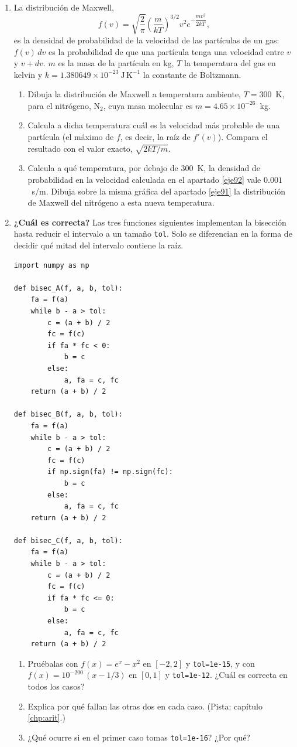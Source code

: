 \begin{enumerate}
\item La distribución de Maxwell,
\begin{equation*}
f(v) = \sqrt{\frac{2}{\pi}}\left( \frac{m}{kT}\right)^{3/2}v^2e^{-\dfrac{\scriptstyle mv^2}{\scriptstyle 2kT}},
\end{equation*}
es la densidad de probabilidad de la velocidad de las partículas de un gas: $f(v)\,dv$ es la probabilidad de que una partícula tenga una velocidad entre $v$ y $v+dv$. $m$ es la masa de la partícula en kg, $T$ la temperatura del gas en kelvin y $k =1.380649\times 10^{-23}\ \text{J}\,\text{K}^{-1}$ la constante de Boltzmann.
\begin{enumerate}
\item \label{eje91}Dibuja la distribución de Maxwell a temperatura ambiente, $T = 300$~K, para el nitrógeno, N$_2$, cuya masa molecular es $m = 4.65 \times 10^{-26}$~kg.
\item \label{eje92}Calcula a dicha temperatura cuál es la velocidad más probable de una partícula (el máximo de $f$, es decir, la raíz de $f'(v)$). Compara el resultado con el valor exacto, $\sqrt{2kT/m}$.
\item Calcula a qué temperatura, por debajo de 300~K, la densidad de probabilidad en la velocidad calculada en el apartado \ref{eje92} vale $0.001$~s/m. Dibuja sobre la misma gráfica del apartado \ref{eje91} la distribución de Maxwell del nitrógeno a esta nueva temperatura.
\end{enumerate}

\item \label{ej:signo} \textbf{¿Cuál es correcta?} Las tres funciones siguientes implementan la bisección hasta reducir el intervalo a un tamaño \texttt{tol}. Solo se diferencian en la forma de decidir qué mitad del intervalo contiene la raíz.
\begin{verbatim}
import numpy as np

def bisec_A(f, a, b, tol):
    fa = f(a)
    while b - a > tol:
        c = (a + b) / 2
        fc = f(c)
        if fa * fc < 0:
            b = c
        else:
            a, fa = c, fc
    return (a + b) / 2

def bisec_B(f, a, b, tol):
    fa = f(a)
    while b - a > tol:
        c = (a + b) / 2
        fc = f(c)
        if np.sign(fa) != np.sign(fc):
            b = c
        else:
            a, fa = c, fc
    return (a + b) / 2

def bisec_C(f, a, b, tol):
    fa = f(a)
    while b - a > tol:
        c = (a + b) / 2
        fc = f(c)
        if fa * fc <= 0:
            b = c
        else:
            a, fa = c, fc
    return (a + b) / 2
\end{verbatim}
\begin{enumerate}
\item Pruébalas con $f(x)=e^x-x^2$ en $[-2,2]$ y \texttt{tol=1e-15}, y con $f(x)=10^{-200}\,(x-1/3)$ en $[0,1]$ y \texttt{tol=1e-12}. ¿Cuál es correcta en todos los casos?
\item Explica por qué fallan las otras dos en cada caso. (Pista: capítulo \ref{chp:arit}.)
\item ¿Qué ocurre si en el primer caso tomas \texttt{tol=1e-16}? ¿Por qué?
\end{enumerate}


\end{enumerate}
